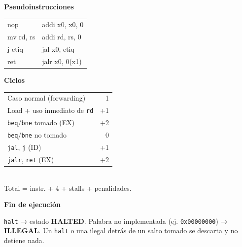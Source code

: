 \documentclass[9pt]{extarticle}
\newcommand{\mono}[1]{\texttt{#1}}
\newcommand{\seccion}[1]{{\color{acento}\bfseries\large #1}\par\vspace{1mm}}
\begin{document}
\begin{minipage}[t]{0.32\linewidth}
\seccion{Pseudoinstrucciones}
{\footnotesize\renewcommand{\arraystretch}{1.05}
\begin{tabular}{@{}>{\ttfamily}l>{\ttfamily}l@{}}
nop      & addi x0, x0, 0 \\
mv rd, rs & addi rd, rs, 0 \\
j etiq   & jal x0, etiq \\
ret      & jalr x0, 0(x1) \\
\end{tabular}}

\vspace{2mm}
\seccion{Ciclos}
{\footnotesize\renewcommand{\arraystretch}{1.05}
\begin{tabular}{@{}l r@{}}
Caso normal (forwarding)          & 1 \\
Load + uso inmediato de \mono{rd}   & +1 \\
\mono{beq}/\mono{bne} tomado (EX)     & +2 \\
\mono{beq}/\mono{bne} no tomado       & 0 \\
\mono{jal}, \mono{j} (ID)             & +1 \\
\mono{jalr}, \mono{ret} (EX)          & +2 \\
\end{tabular}\\[0.5mm]
Total = instr. + 4 + stalls + penalidades.}

\vspace{2mm}
\seccion{Fin de ejecución}
{\footnotesize
\mono{halt} → estado \textbf{HALTED}. Palabra no implementada (ej. \mono{0x00000000}) → \textbf{ILLEGAL}.
Un \mono{halt} o una ilegal detrás de un salto tomado se descarta y no detiene nada.\par}
\end{minipage}\hfill
\end{document}

